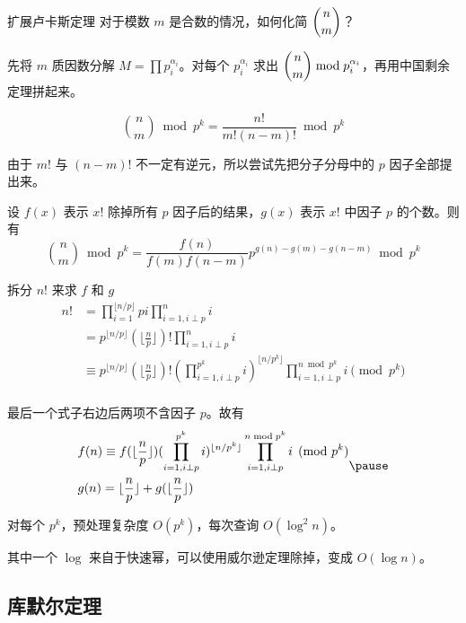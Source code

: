 \documentclass[../main.tex]{subfiles}
\begin{document}
\begin{frame}{扩展卢卡斯定理}
对于模数 $m$ 是合数的情况，如何化简 $\dbinom{n}{m}$？ \pause

先将 $m$ 质因数分解 $M=\prod p_i^{\alpha_i}$。对每个 $p_i^{\alpha_i}$ 求出 $\dbinom{n}{m}\bmod p_i^{\alpha_i}$，再用中国剩余定理拼起来。 \pause
\medskip

$$
\binom{n}{m}\bmod p^k=\frac{n!}{m!(n-m)!}\bmod p^k
$$
\end{frame}

\begin{frame}
由于 $m!$ 与 $(n-m)!$ 不一定有逆元，所以尝试先把分子分母中的 $p$ 因子全部提出来。

设 $f(x)$ 表示 $x!$ 除掉所有 $p$ 因子后的结果，$g(x)$ 表示 $x!$ 中因子 $p$ 的个数。则有
$$
\binom{n}{m}\bmod p^k=\frac{f(n)}{f(m)f(n-m)}p^{g(n)-g(m)-g(n-m)}\bmod p^k
$$
\end{frame}

\begin{frame}
拆分 $n!$ 来求 $f$ 和 $g$
$$
\begin{aligned}
n!&=\prod_{i=1}^{\lfloor n/p\rfloor}pi\prod_{i=1,i\perp p}^n i\\
&=p^{\lfloor n/p\rfloor}(\lfloor\frac{n}{p}\rfloor)!\prod_{i=1,i\perp p}^n i\\
&\equiv p^{\lfloor n/p\rfloor}(\lfloor\frac{n}{p}\rfloor)!(\prod_{i=1,i\perp p}^{p^k}i)^{\lfloor n/p^k\rfloor}\prod_{i=1,i\perp p}^{n\bmod p^k}i\pmod {p^k}\\
\end{aligned}
$$
\end{frame}

\begin{frame}
最后一个式子右边后两项不含因子 $p$。故有
$$
\begin{aligned}
& f(n)\equiv f(\lfloor\frac{n}{p}\rfloor)(\prod_{i=1,i\perp p}^{p^k}i)^{\lfloor n/p^k\rfloor}\prod_{i=1,i\perp p}^{n\bmod p^k}i\pmod {p^k}\\
& g(n)=\lfloor\frac{n}{p}\rfloor+g(\lfloor\frac{n}{p}\rfloor)
\end{aligned} \pause
$$

对每个 $p^k$，预处理复杂度 $O(p^k)$，每次查询 $O(\log^2 n)$。\pause

其中一个 $\log$ 来自于快速幂，可以使用威尔逊定理除掉，变成 $O(\log n)$。
\end{frame}

\subsection{库默尔定理}
\end{document}
